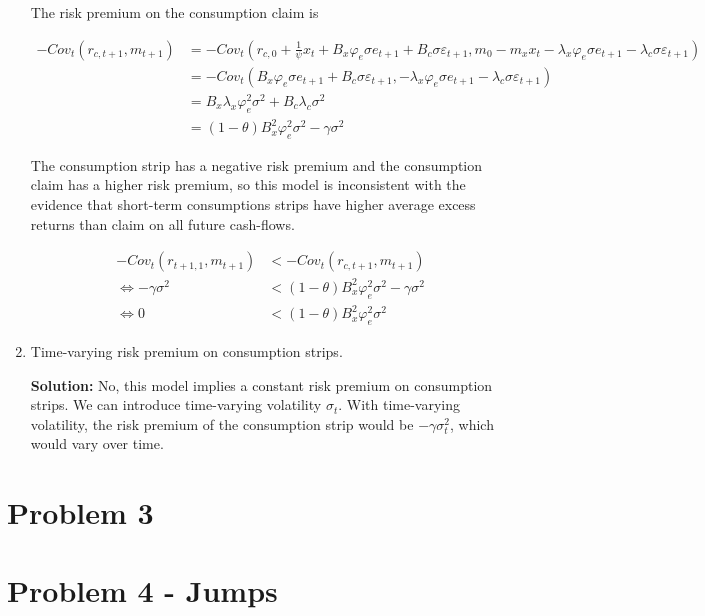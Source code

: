 \documentclass{article}
\begin{document}
\begin{enumerate}
The risk premium on the consumption claim is

\begin{align*}
-Cov_t(r_{c,t+1}, m_{t+1}) 
&= -Cov_t(r_{c,0} +  \frac{1}{\psi} x_t  + B_x \varphi_e\sigma e_{t+1} + B_c \sigma \varepsilon_{t+1}, m_0 - m_x x_t -\lambda_x \varphi_e \sigma e_{t+1} - \lambda_c \sigma \varepsilon_{t+1})\\
&= -Cov_t( B_x \varphi_e\sigma e_{t+1} + B_c \sigma \varepsilon_{t+1}, -\lambda_x \varphi_e \sigma e_{t+1} - \lambda_c \sigma \varepsilon_{t+1})\\
&= B_x\lambda_x \varphi_e^2 \sigma^2 + B_c \lambda_c \sigma^2\\
&= (1-\theta)B_x^2 \varphi_e^2\sigma^2 -\gamma \sigma^2
\end{align*}

The consumption strip has a negative risk premium and the consumption claim has a higher risk premium, so this model is inconsistent with the evidence that short-term consumptions strips have higher average excess returns than claim on all future cash-flows.

\begin{align*}
-Cov_t(r_{t+1, 1}, m_{t+1}) &< -Cov_t(r_{c,t+1}, m_{t+1}) \\
\iff
-\gamma \sigma^2 &< (1-\theta)B_x^2 \varphi_e^2\sigma^2 -\gamma \sigma^2\\
\iff
0 &< (1-\theta)B_x^2 \varphi_e^2\sigma^2
\end{align*}

\item Time-varying risk premium on consumption strips.

\bigskip

\textbf{Solution:} No, this model implies a constant risk premium on consumption strips.  We can introduce time-varying volatility $\sigma_t$. With time-varying volatility, the risk premium of the consumption strip would be $-\gamma \sigma_t^2$, which would vary over time.

\end{enumerate}

\pagebreak

\section{Problem 3}


\pagebreak

\section{Problem 4 - Jumps}
\end{document}
